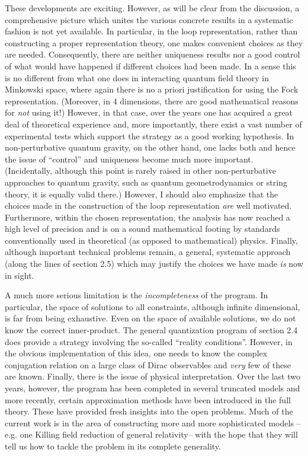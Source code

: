 These developments are exciting. However, as will be clear from the
discussion, a comprehensive picture which unites the various concrete
results in a systematic fashion is not yet available. In particular, in the
loop representation, rather than constructing a proper representation theory,
one makes convenient choices as they are needed. Consequently, there are
neither uniqueness results nor a good control of what would have happened
if different choices had been made. In a sense this is no different from
what one does in interacting quantum field theory in Minkowski space, where
again there is no a priori justification for using the Fock representation.
(Moreover, in 4 dimensions, there are good mathematical reasons for {\it not}
using it!) However, in that case, over the years one has acquired a great deal
of theoretical experience and, more importantly, there exist a vast number of
experimental tests which support the strategy as a good working hypothesis.
In non-perturbative quantum gravity, on the other hand, one lacks both and
hence the issue of ``control'' and uniqueness become much more important.
(Incidentally, although this point is rarely raised in other non-perturbative
approaches to quantum gravity, such as quantum geometrodynamics or string
theory, it is equally valid there.) However, I should also emphasize that the
choices made in the construction of the loop representation {\it are} well
motivated. Furthermore, within the chosen representation, the analysis has now
reached a high level of precision and is on a sound  mathematical footing by
standards conventionally used in theoretical (as opposed to mathematical)
physics. Finally, although important technical problems remain, a general,
systematic approach (along the lines of section 2.5) which may justify
the choices we have made {\it is} now in sight.

A much more serious limitation is the {\it incompleteness} of the program. In
particular, the space of solutions to all constraints, although infinite
dimensional, is far from being exhaustive. Even on the space of available
solutions, we do not know the correct inner-product. The general quantization
program of section 2.4 does provide a strategy involving the so-called
``reality conditions''. However, in the obvious implementation of this idea,
one needs to know the complex conjugation relation on a large class of Dirac
observables and {\it very} few of these are known. Finally, there is the
issue of physical interpretation. Over the last two years, however, the
program has been completed in several truncated models and more recently,
certain approximation methods have been introduced in the full theory. These
have provided fresh insights into the open problems. Much of the
current work is in the area of constructing more and more sophisticated models
--e.g. one Killing field reduction of general relativity-- with the hope that
they will tell us how to tackle the problem in its complete generality.

